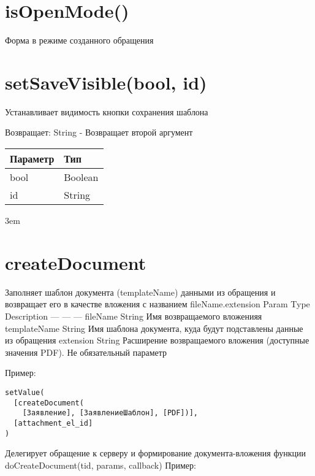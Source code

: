 \hypertarget{isopenmode-boolean}{%
\section{isOpenMode()}\label{isopenmode-boolean}}

Форма в режиме созданного обращения


\hypertarget{setsavevisiblebool-id-string}{%
\section{setSaveVisible(bool, id)}\label{setsavevisiblebool-id-string}}

Устанавливает видимость кнопки сохранения шаблона

Возвращает: String - Возвращает второй аргумент

\begin{longtable}[]{@{}ll@{}}
\toprule
Параметр & Тип\tabularnewline
\midrule
\endhead
bool & Boolean\tabularnewline
id & String\tabularnewline
\bottomrule
\end{longtable}
\emergencystretch 3em
\hypertarget{filename-templatename-extension}{%
\section{createDocument}\label{filename-templatename-extension}}

Заполняет шаблон документа (templateName) данными из обращения и
возвращает его в качестве вложения с названием fileName.extension
\textbar{} Param \textbar{} Type \textbar{} Description \textbar{}
\textbar{} --- \textbar{} --- \textbar{} --- \textbar{} \textbar{}
fileName \textbar{} String \textbar{} Имя возвращаемого вложенияя
\textbar{} \textbar{} templateName \textbar{} String \textbar{} Имя
шаблона документа, куда будут подставлены данные из обращения \textbar{}
\textbar{} extension \textbar{} String \textbar{} Расширение
возвращаемого вложения (доступные значения PDF). Не обязательный
параметр \textbar{}

Пример:

\begin{verbatim}
setValue(
  [createDocument(
    [Заявление], [ЗаявлениеШаблон], [PDF])], 
  [attachment_el_id]
)

\end{verbatim}

Делегирует обращение к серверу и формирование документа-вложения функции
doCreateDocument(tid, params, callback) Пример:

